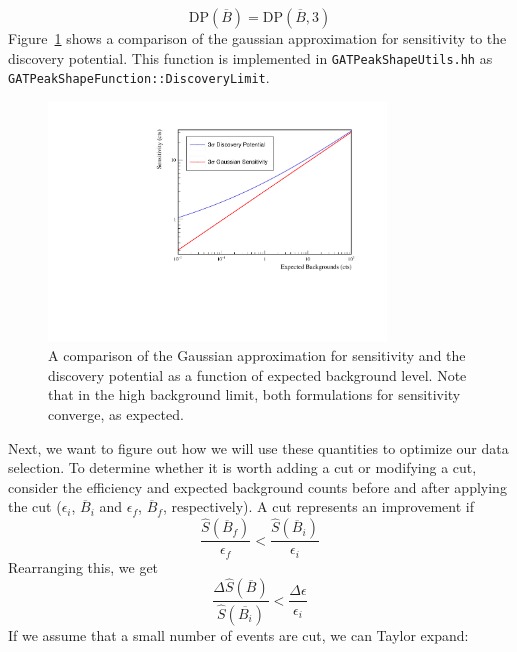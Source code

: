 \documentclass[/main.tex]{subfiles}
\begin{document}
\begin{equation}
  \mathrm{DP}(\overline{B}) = \mathrm{DP}(\overline{B}, 3)
\end{equation}
Figure~\ref{fig:DPvSens} shows a comparison of the gaussian approximation for sensitivity to the discovery potential.
This function is implemented in \texttt{GATPeakShapeUtils.hh} as \linebreak\texttt{GATPeakShapeFunction::DiscoveryLimit}.
\\
\begin{figure}[h]
  \centering
  \includegraphics[width=0.8\textwidth]{DPvSens}
  \caption[Comparison between sensitivity in Gaussian background approximation and Discovery Potential] {\label{fig:DPvSens}
    A comparison of the Gaussian approximation for sensitivity and the discovery potential as a function of expected background level. Note that in the high background limit, both formulations for sensitivity converge, as expected.
    }
\end{figure}
Next, we want to figure out how we will use these quantities to optimize our data selection.
To determine whether it is worth adding a cut or modifying a cut, consider the efficiency and expected background counts before and after applying the cut ($\epsilon_i$, $\overline{B}_i$ and $\epsilon_f$, $\overline{B}_f$, respectively).
A cut represents an improvement if
\begin{equation}
  \frac{\hat{S}(\overline{B}_f)}{\epsilon_f} <\frac{\hat{S}(\overline{B}_i)}{\epsilon_i}
\end{equation}
Rearranging this, we get
\begin{equation}
  \frac{\Delta \hat{S}(\overline{B})}{\hat{S}(\overline{B_i})} < \frac{\Delta\epsilon}{\epsilon_i}
\end{equation}
If we assume that a small number of events are cut, we can Taylor expand:
\end{document}
